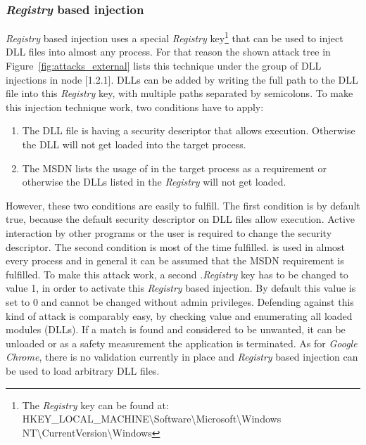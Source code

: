 \subsubsection{\emph{Registry} based injection}
\emph{Registry} based injection uses a special \emph{Registry} key\footnote{The \emph{Registry} key can be found at: HKEY\_LOCAL\_MACHINE\textbackslash Software\textbackslash Microsoft\textbackslash Windows NT\textbackslash CurrentVersion\textbackslash Windows} that can be used to inject \gls{DLL} files into almost any process. For that reason the shown attack tree in Figure~\ref{fig:attacks_external} lists this technique under the group of \gls{DLL} injections in node [1.2.1]. \glspl{DLL} can be added by writing the full path to the \gls{DLL} file into this \emph{Registry} key, with multiple paths separated by semicolons. To make this injection technique work, two conditions have to apply:
\begin{enumerate}
\item The \gls{DLL} file is having a security descriptor that allows execution. Otherwise the \gls{DLL} will not get loaded into the target process.
\item The \gls{MSDN} \cite{msdn_appinitdlls} lists the usage of  in the target process as a requirement or otherwise the \glspl{DLL} listed in the \emph{Registry} will not get loaded.
\end{enumerate}
However, these two conditions are easily to fulfill. The first condition is by default true, because the default security descriptor on \gls{DLL} files allow execution. Active interaction by other programs or the user is required to change the security descriptor. The second condition is most of the time fulfilled.  is used in almost every process and in general it can be assumed that the \gls{MSDN} requirement is fulfilled. To make this attack work, a second .\emph{Registry} key  has to be changed to value 1, in order to activate this \emph{Registry} based injection. By default this value is set to 0 and cannot be changed without admin privileges.
Defending against this kind of attack is comparably easy, by checking  value and enumerating all loaded modules (\glspl{DLL}). If a match is found and considered to be unwanted, it can be unloaded or as a safety measurement the application is terminated. As for \emph{Google Chrome}, there is no validation currently in place and \emph{Registry} based injection can be used to load arbitrary \gls{DLL} files.